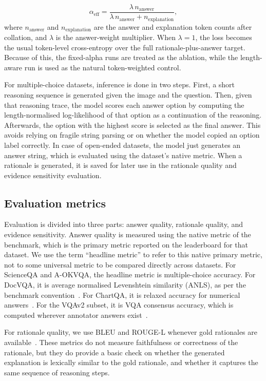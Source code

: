 \documentclass[preprint,12pt]{elsarticle}
\begin{document}
\begin{equation}
    \alpha_{\text{eff}} =
    \frac{\lambda\,n_{\text{answer}}}{\lambda\,n_{\text{answer}} + n_{\text{explanation}}},
    \label{Eq:LengthAlpha}
\end{equation}
where $n_{\text{answer}}$ and $n_{\text{explanation}}$ are the answer and explanation token counts after collation, and $\lambda$ is the answer-weight multiplier.
When $\lambda=1$, the loss becomes the usual token-level cross-entropy over the full rationale-plus-answer target.
Because of this, the fixed-alpha runs are treated as the ablation, while the length-aware run is used as the natural token-weighted control.

For multiple-choice datasets, inference is done in two steps.
First, a short reasoning sequence is generated given the image and the question.
Then, given that reasoning trace, the model scores each answer option by computing the length-normalised log-likelihood of that option as a continuation of the reasoning.
Afterwards, the option with the highest score is selected as the final answer.
This avoids relying on fragile string parsing or on whether the model copied an option label correctly.
In case of open-ended datasets, the model just generates an answer string, which is evaluated using the dataset's native metric.
When a rationale is generated, it is saved for later use in the rationale quality and evidence sensitivity evaluation.

\subsection{Evaluation metrics}
Evaluation is divided into three parts: answer quality, rationale quality, and evidence sensitivity.
Answer quality is measured using the native metric of the benchmark, which is the primary metric reported on the leaderboard for that dataset.
We use the term ``headline metric'' to refer to this native primary metric,
not to some universal metric to be compared directly across datasets.
For ScienceQA and A-OKVQA, the headline metric is multiple-choice accuracy.
For DocVQA, it is average normalised Levenshtein similarity (ANLS), as per the benchmark convention~\cite{mathew2021docvqa}.
For ChartQA, it is relaxed accuracy for numerical answers~\cite{masry2022chartqa}.
For the VQAv2 subset, it is VQA consensus accuracy, which is computed wherever annotator answers exist~\cite{antol2015vqa,goyal2017vqav2}.

For rationale quality, we use BLEU and ROUGE-L whenever gold rationales are available~\cite{papineni2002bleu,lin2004rouge}.
These metrics do not measure faithfulness or correctness of the rationale, but they do provide a basic check on 
whether the generated explanation is lexically similar to the gold rationale, and whether it captures the same sequence of reasoning steps.
\end{document}
